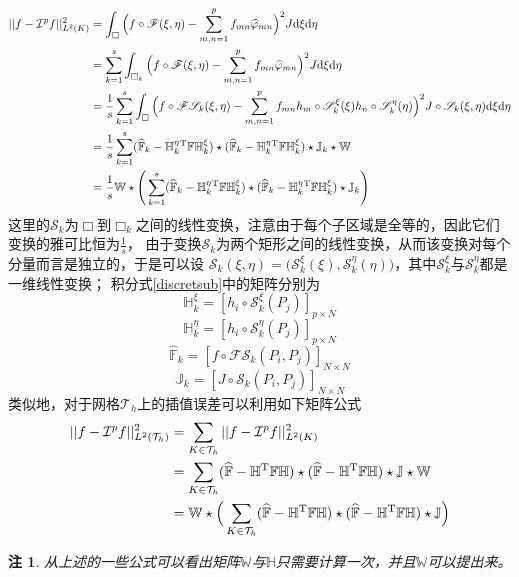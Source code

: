 \documentclass[10pt,reqno, final]{ctexartutf8}
\newtheorem{remark}{注}[section]
\begin{document}
\begin{equation}\label{discretsub}
\begin{split}
|| f - \mathcal I^p f ||_{L^2(K)} ^2
&= \int_{\Box} \Big(f\circ\mathscr F(\xi, \eta)-  \sum_{m,n=1}^{p} f_{mn} \widehat{\varphi}_{mn} \Big)^2 J \text{d}\xi\text{d}\eta\\
&= \sum_{k=1}^{s}\int_{\Box_k} \Big(f\circ\mathscr F(\xi, \eta) -  \sum_{m,n=1}^{p} f_{mn} \widehat{\varphi}_{mn} \Big)^2 J \text{d}\xi\text{d}\eta\\
&= \frac{1}{s}\sum_{k=1}^{s}\int_{\Box} \Big( f\circ\mathscr F\mathscr S_k(\xi, \eta)
    - \sum_{m,n=1}^{p} f_{mn} h_m \circ\mathscr S_k^{\xi}(\xi) h_n \circ\mathscr S_k^{\eta}(\eta) \Big)^2
    J\circ\mathscr S_k(\xi, \eta) \text{d}\xi\text{d}\eta\\
&= \frac{1}{s}\sum_{k=1}^{s} (\mathbb{\widehat F}_{k} - \mathbb{H}_k^{\eta}{}^{\rm T}\mathbb{F} \mathbb{H}_k^{\xi})\star
                             (\mathbb{\widehat F}_{k} - \mathbb{H}_k^{\eta}{}^{\rm T}\mathbb{F} \mathbb{H}_k^{\xi})\star
                                \mathbb{J}_k\star \mathbb{W}\\
& = \frac{1}{s}\mathbb{W}\star
\Bigg( \sum_{k=1}^{s} (\mathbb{\widehat F}_{k} - \mathbb{H}_k^{\eta}{}^{\rm T}\mathbb{F} \mathbb{H}_k^{\xi})\star
        (\mathbb{\widehat F}_{k} - \mathbb{H}_k^{\eta}{}^{\rm T}\mathbb{F} \mathbb{H}_k^{\xi})\star
        \mathbb{J}_k
\Bigg)
\end{split}
\end{equation}
这里的$\mathscr S_k$为$\Box$到$\Box_k$之间的线性变换，注意由于每个子区域是全等的，因此它们变换的雅可比恒为$\frac{1}{s}$，
由于变换$\mathscr S_k$为两个矩形之间的线性变换，从而该变换对每个分量而言是独立的，于是可以设
$\mathscr S_k(\xi, \eta) = \big(\mathscr S_k^{\xi}(\xi), \mathscr S_k^{\eta}(\eta)\big)$，其中$\mathscr S_k^{\xi}$与$\mathscr S_k^{\eta}$都是一维线性变换；
积分式\eqref{discretsub}中的矩阵分别为
\[\mathbb{H}_k^{\xi} = [h_i\circ\mathscr S_k^{\xi}(P_j)]_{p\times N}\]
\[\mathbb{H}_k^{\eta} = [h_i\circ\mathscr S_k^{\eta}(P_j)]_{p\times N}\]
\[ \mathbb{\widehat F}_k = [ f\circ\mathscr F\mathscr S_k(P_i, P_j)]_{N\times N}\]
\[\mathbb{J}_k = [J\circ\mathscr S_k(P_i, P_j)]_{N\times N}\]
类似地，对于网格$\mathcal{T}_h$上的插值误差可以利用如下矩阵公式
\begin{equation*}
  \begin{split}
|| f - \mathcal I^p f ||_{L^2(\mathcal{T}_h)} ^2
&= \sum_{K\in \mathcal{T}_h}|| f - \mathcal I^p f ||_{L^2(K)} ^2 \\
&= \sum_{K\in \mathcal{T}_h}  (\mathbb{\widehat F} - \mathbb{H}^{\rm T}\mathbb{F} \mathbb{H})
        \star(\mathbb{\widehat F} - \mathbb{H}^{\rm T}\mathbb{F} \mathbb{H}) \star \mathbb{J}\star \mathbb{W}\\
&= \mathbb{W}\star \Big(\sum_{K\in \mathcal{T}_h} (\mathbb{\widehat F} - \mathbb{H}^{\rm T}\mathbb{F} \mathbb{H})
        \star(\mathbb{\widehat F} - \mathbb{H}^{\rm T}\mathbb{F} \mathbb{H}) \star \mathbb{J}\Big)
   \end{split}
\end{equation*}
\begin{remark}
从上述的一些公式可以看出矩阵$\mathbb{W}$与$\mathbb{H}$只需要计算一次，并且$\mathbb{W}$可以提出来。
\end{remark}
\end{document}

